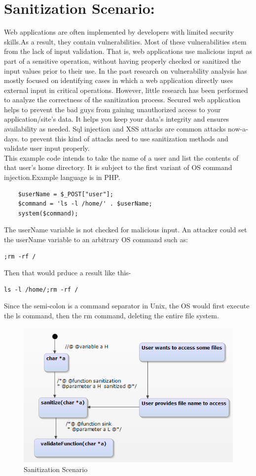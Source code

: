 \section{Sanitization Scenario:}
Web applications are often implemented by developers with limited security skills.As a result, they
contain vulnerabilities. Most of these vulnerabilities stem
from the lack of input validation. That is, web applications
use malicious input as part of a sensitive operation, without having properly checked or sanitized the input values
prior to their use.
In the past research on vulnerability analysis has mostly focused on identifying cases in which a web application directly uses external input in critical operations. However,
little research has been performed to analyze the correctness of the sanitization process. Secured web application helps to prevent the bad guys from gaining unauthorized access to your application/site's data. It helps you keep your data's integrity and ensures availability as needed. Sql injection and XSS attacks are common attacks now-a-days. to prevent this kind of attacks need to use sanitization methods and validate user input properly.\\
This example code intends to take the name of a user and list the contents of that user's home directory. It is subject to the first variant of OS command injection.Example language is in PHP.

\begin{lstlisting}
	$userName = $_POST["user"];
	$command = 'ls -l /home/' . $userName;
	system($command);
\end{lstlisting} 

The userName variable is not checked for malicious input. An attacker could set the userName variable to an arbitrary OS command such as:
\begin{lstlisting}
;rm -rf /
\end{lstlisting}
Then that would prduce a result like this-
\begin{lstlisting}
ls -l /home/;rm -rf /
\end{lstlisting}
Since the semi-colon is a command separator in Unix, the OS would first execute the ls command, then the rm command, deleting the entire file system.

\begin{figure}[htbp]
	\centering
	\includegraphics{styles/sanitization_scenario.png}
	\caption{Sanitization Scenario}
\end{figure}